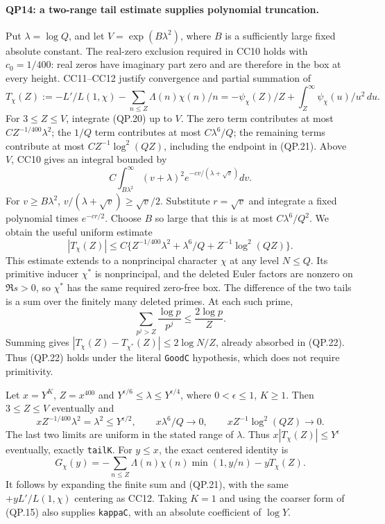 \paragraph{QP14: a two-range tail estimate supplies polynomial truncation.}
Put $\lambda=\log Q$, and let $V=\exp(B\lambda^2)$, where $B$ is a
sufficiently large fixed absolute constant.  The real-zero exclusion
required in CC10 holds with $c_0=1/400$: real zeros have imaginary part
zero and are therefore in the box at every height.
CC11--CC12 justify convergence and partial summation of
\[
 T_\chi(Z):=-L'/L(1,\chi)-\sum_{n\le Z}\Lambda(n)\chi(n)/n
       =-\psi_\chi(Z)/Z+\int_Z^\infty\psi_\chi(u)/u^2\,du.\tag{QP.21}
\]
For $3\le Z\le V$, integrate (QP.20) up to $V$.
The zero term contributes at most $C Z^{-1/400}\lambda^2$;
the $1/Q$ term contributes at most $C\lambda^6/Q$;
the remaining terms contribute at most
$CZ^{-1}\log^2(QZ)$, including the endpoint in (QP.21).
Above $V$, CC10 gives an integral bounded by
\[
 C\int_{B\lambda^2}^{\infty}(v+\lambda)^2
             e^{-cv/(\lambda+\sqrt v)}dv.
\]
For $v\ge B\lambda^2$, $v/(\lambda+\sqrt v)\ge\sqrt v/2$.
Substitute $r=\sqrt v$ and integrate a fixed polynomial times
$e^{-cr/2}$.  Choose $B$ so large that this is at most $C\lambda^6/Q^2$.
We obtain the useful uniform estimate
\[
 |T_\chi(Z)|\le C\{Z^{-1/400}\lambda^2+
                  \lambda^6/Q+Z^{-1}\log^2(QZ)\}.     \tag{QP.22}
\]
This estimate extends to a nonprincipal character $\chi$ at any level
$N\le Q$.  Its primitive inducer $\chi^*$ is nonprincipal, and the deleted
Euler factors are nonzero on $\Re s>0$, so $\chi^*$ has the same required
zero-free box.  The difference of the two tails is a sum over the finitely
many deleted primes.  At each such prime,
\[
 \sum_{p^j>Z}\frac{\log p}{p^j}\le\frac{2\log p}{Z}.
\]
Summing gives $|T_\chi(Z)-T_{\chi^*}(Z)|\le2\log N/Z$, already
absorbed in (QP.22).  Thus (QP.22) holds under the literal
\texttt{GoodC} hypothesis, which does not require primitivity.

Let $x=Y^K$, $Z=x^{400}$ and
$Y^{\epsilon/6}\le\lambda\le Y^{\epsilon/4}$, where
$0<\epsilon\le1$, $K\ge1$.  Then $3\le Z\le V$ eventually and
\[
 xZ^{-1/400}\lambda^2=\lambda^2\le Y^{\epsilon/2},
 \qquad x\lambda^6/Q\longrightarrow0,
 \qquad xZ^{-1}\log^2(QZ)\longrightarrow0.
\]
The last two limits are uniform in the stated range of $\lambda$.
Thus $x|T_\chi(Z)|\le Y^\epsilon$ eventually, exactly \texttt{tailK}.
For $y\le x$, the exact centered identity is
\[
 G_\chi(y)=-\sum_{n\le Z}\Lambda(n)\chi(n)\min(1,y/n)
                                                 -yT_\chi(Z).\tag{QP.23}
\]
It follows by expanding the finite sum and (QP.21), with the same
$+yL'/L(1,\chi)$ centering as CC12.  Taking $K=1$ and using the
coarser form of (QP.15) also supplies \texttt{kappaC}, with an absolute
coefficient of $\log Y$.

